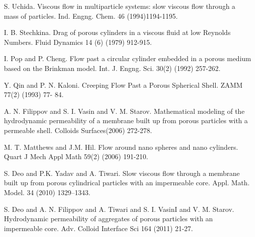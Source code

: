 \documentclass[article, A4, 11pt]{llncs}%
\begin{document}

\begin{thebibliography}{10}
{\sc S. Uchida}. {Viscous flow in multiparticle systems: slow viscous flow through a mass of particles}. Ind. Engng. Chem. 46 (1994)1194-1195.

{\sc I. B. Stechkina}. {Drag of porous cylinders in a viscous fluid at low Reynolds Numbers}. Fluid Dynamics 14 (6) (1979)  912-915.

{\sc I. Pop and P. Cheng}. {Flow past a circular cylinder embedded in a porous medium based on the Brinkman model}. Int. J. Engng. Sci. 30(2) (1992)  257-262.

{\sc Y. Qin and P. N. Kaloni}. {Creeping Flow Past a Porous Spherical Shell}. ZAMM 77(2) (1993) 77- 84.

{\sc A. N. Filippov and S. I. Vasin and V. M. Starov}. {Mathematical modeling of the hydrodynamic permeability of a membrane built up from porous particles with a permeable shell}. Colloids  Surfaces(2006) 272-278.

{\sc M. T. Matthews and J.M. Hil}. {Flow around nano spheres and nano cylinders}. Quart J Mech Appl Math 59(2) (2006) 191-210.

{\sc S. Deo and P.K. Yadav and A. Tiwari}. {Slow viscous flow through a membrane built up from porous cylindrical particles with an impermeable core}. Appl. Math. Model. 34 (2010) 1329–1343.

{\sc S. Deo and A. N. Filippov and A. Tiwari and S. I. VasinI and V. M. Starov}. {Hydrodynamic permeability of aggregates of porous particles with an impermeable core}. Adv. Colloid Interface Sci 164 (2011) 21-27.
\end{thebibliography} %
\end{document}
